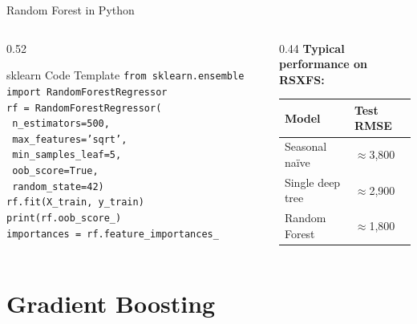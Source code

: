 \documentclass[aspectratio=169, 11pt]{beamer}
\begin{document}
\begin{frame}{Random Forest in Python}
  \begin{columns}[T]
    \begin{column}{0.52\textwidth}
      \begin{examplebox}{sklearn Code Template}
        {\scriptsize
        \texttt{from sklearn.ensemble import RandomForestRegressor}\\
        \texttt{rf = RandomForestRegressor(}\\
        \texttt{    n\_estimators=500,}\\
        \texttt{    max\_features='sqrt',}\\
        \texttt{    min\_samples\_leaf=5,}\\
        \texttt{    oob\_score=True,}\\
        \texttt{    random\_state=42)}\\
        \texttt{rf.fit(X\_train, y\_train)}\\
        \texttt{print(rf.oob\_score\_)}\\
        \texttt{importances = rf.feature\_importances\_}
        }
      \end{examplebox}
    \end{column}
    \begin{column}{0.44\textwidth}
      \textbf{Typical performance on RSXFS:}
      \begin{center}
        {\footnotesize
        \begin{tabular}{ll}
          \toprule
          \textbf{Model} & \textbf{Test RMSE} \\
          \midrule
          Seasonal na\"{i}ve & $\approx$3,800 \\
          Single deep tree  & $\approx$2,900 \\
          Random Forest     & $\approx$1,800 \\
          \bottomrule
        \end{tabular}
        }
      \end{center}
    \end{column}
  \end{columns}
\end{frame}

\section{Gradient Boosting}
\end{document}
